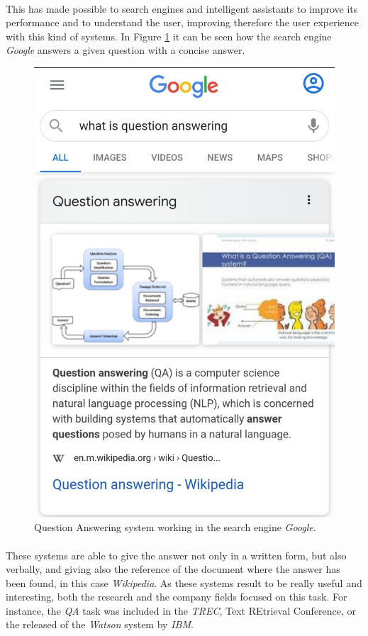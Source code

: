 \paragraph{}
This has made possible to search engines and intelligent assistants to improve its performance and to understand the user, improving therefore the user experience with this kind of systems. In Figure \ref{fig:google} it can be seen how the search engine \emph{Google} answers a given question with a concise answer.
\begin{figure}[!h]
	\centering
	\includegraphics[scale=0.15]{images/google}
	\caption{Question Answering system working in the search engine \emph{Google}.}
	\label{fig:google}
\end{figure}
\paragraph{}
These systems are able to give the answer not only in a written form, but also verbally, and giving also the reference of the document where the answer has been found, in this case \emph{Wikipedia}. As these systems result to be really useful and interesting, both the research and the company fields focused on this task. For instance, the \emph{QA} task was included in the \emph{TREC}, Text REtrieval Conference, or the released of the \emph{Watson} system by \emph{IBM}.
